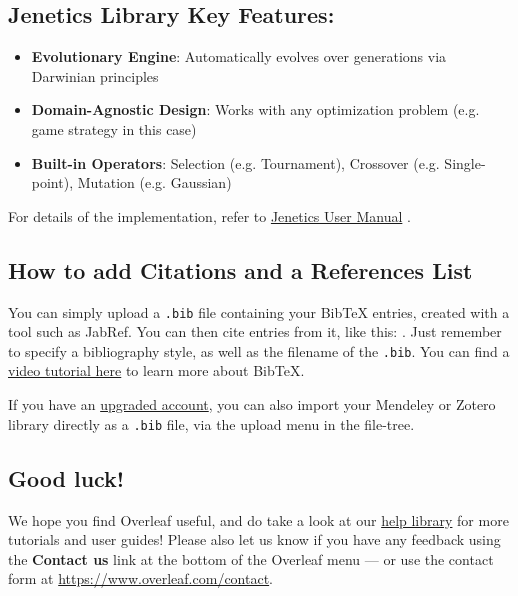 \documentclass[sigconf]{acmart} %
\begin{document}
\subsection{Jenetics Library Key Features:}
\begin{itemize}
    \item \textbf{Evolutionary Engine}: Automatically evolves over generations via Darwinian principles
    \item \textbf{Domain-Agnostic Design}: Works with any optimization problem (e.g. game strategy in this case)
    \item \textbf{Built-in Operators}: Selection (e.g. Tournament), Crossover (e.g. Single-point), Mutation (e.g. Gaussian)
\end{itemize}
For details of the implementation, refer to \href{https://jenetics.io/manual/manual-8.2.0.pdf}{Jenetics User Manual} \cite{jenetics2024}.
\subsection{How to add Citations and a References List}

You can simply upload a \verb|.bib| file containing your BibTeX entries, created with a tool such as JabRef. You can then cite entries from it, like this: \cite{greenwade93}. Just remember to specify a bibliography style, as well as the filename of the \verb|.bib|. You can find a \href{https://www.overleaf.com/help/97-how-to-include-a-bibliography-using-bibtex}{video tutorial here} to learn more about BibTeX.

If you have an \href{https://www.overleaf.com/user/subscription/plans}{upgraded account}, you can also import your Mendeley or Zotero library directly as a \verb|.bib| file, via the upload menu in the file-tree.

\subsection{Good luck!}

We hope you find Overleaf useful, and do take a look at our \href{https://www.overleaf.com/learn}{help library} for more tutorials and user guides! Please also let us know if you have any feedback using the \textbf{Contact us} link at the bottom of the Overleaf menu --- or use the contact form at \url{https://www.overleaf.com/contact}.



\end{document}

